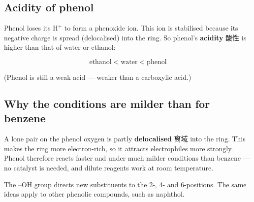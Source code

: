 \documentclass[11pt]{article}
\begin{document}
\subsection*{Acidity of phenol}

Phenol loses its $\text{H}^+$ to form a phenoxide ion. This ion is stabilised because its negative charge is spread (delocalised) into the ring. So phenol's \textbf{acidity} 酸性 is higher than that of water or ethanol:

\[
\text{ethanol} < \text{water} < \text{phenol}
\]

(Phenol is still a weak acid — weaker than a carboxylic acid.)

\subsection*{Why the conditions are milder than for benzene}

A lone pair on the phenol oxygen is partly \textbf{delocalised} 离域 into the ring. This makes the ring more electron-rich, so it attracts electrophiles more strongly. Phenol therefore reacts faster and under much milder conditions than benzene — no catalyst is needed, and dilute reagents work at room temperature.

The $\text{–OH}$ group directs new substituents to the 2-, 4- and 6-positions. The same ideas apply to other phenolic compounds, such as naphthol.
\end{document}

